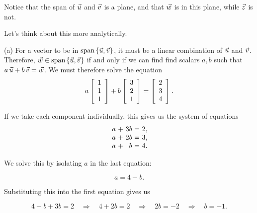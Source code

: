 \documentclass{ximera}
\begin{document}
\begin{exploration}
\begin{example}
\begin{solution}
  \begin{center}
  \end{center}

  Notice that the span of $\vect{u}$ and $\vect{v}$ is a plane, and that $\vect{w}$ is in this plane, while $\vect{z}$ is not.

\end{solution}

  \begin{solution}

    Let's think about this more analytically.

    (a) For a vector to be in $\sspan\set{\vect{u},\vect{v}}$, it must
    be a linear combination of $\vect{u}$ and $\vect{v}$. Therefore,
    $\vect{w}\in\sspan\set{\vect{u},\vect{v}}$ if and only if we can
    find find scalars $a,b$ such that
    $a\,\vect{u} + b\,\vect{v} = \vect{w}$. We must therefore solve the
    equation
    \begin{equation*}
      a \startmat{r} 1 \\ 1 \\ 1 \stopmat
      + b \startmat{r} 3 \\ 2 \\ 1 \stopmat
      = \startmat{r} 2 \\ 3 \\ 4 \stopmat.
    \end{equation*}
   
    If we take each component individually, this gives us the system of equations
    \begin{equation*}
      \begin{array}{r@{~}c@{~}r@{~}c@{~}r@{~}r}
        a & + & 3b & = & 2, \\
        a & + & 2b & = & 3, \\
        a & + & b & = & 4.
      \end{array}
    \end{equation*}

    We solve this by isolating $a$ in the last equation: 

    \begin{equation*}
      a = 4 - b.
    \end{equation*}

    Substituting this into the first equation gives us

    \begin{equation*}
      4 - b + 3b = 2 \quad \Rightarrow \quad 4 + 2b = 2 \quad \Rightarrow \quad 2b = -2 \quad \Rightarrow \quad b = -1.
    \end{equation*}


\end{solution}
\end{example}
\end{exploration}
\end{document}
